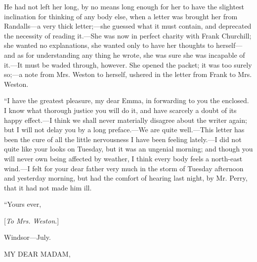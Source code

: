He had not left her long, by no means long enough for her to have the slightest inclination for thinking of any body else, when a letter was brought her from Randalls---a very thick letter;---she guessed what it must contain, and deprecated the necessity of reading it.---She was now in perfect charity with Frank Churchill; she wanted no explanations, she wanted only to have her thoughts to herself---and as for understanding any thing he wrote, she was sure she was incapable of it.---It must be waded through, however. She opened the packet; it was too surely so;---a note from Mrs. Weston to herself, ushered in the letter from Frank to Mrs. Weston.

“I have the greatest pleasure, my dear Emma, in forwarding to you the enclosed. I know what thorough justice you will do it, and have scarcely a doubt of its happy effect.---I think we shall never materially disagree about the writer again; but I will not delay you by a long preface.---We are quite well.---This letter has been the cure of all the little nervousness I have been feeling lately.---I did not quite like your looks on Tuesday, but it was an ungenial morning; and though you will never own being affected by weather, I think every body feels a north-east wind.---I felt for your dear father very much in the storm of Tuesday afternoon and yesterday morning, but had the comfort of hearing last night, by Mr. Perry, that it had not made him ill.

“Yours ever,\crlf
{}

{[}{\em To Mrs. Weston}.{]}

Windsor---July.

MY DEAR MADAM,

